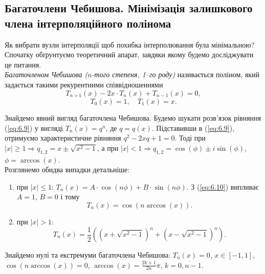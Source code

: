 \subsection{Багаточлени Чебишова. Мінімізація залишкового члена інтерполяційного полінома}

Як вибрати вузли інтерполяції щоб похибка інтерполювання була мінімальною? Спочатку обґрунтуємо теоретичний апарат, завдяки якому будемо досліджувати це питання. \\

\textit{Багаточленом Чебишова ($n$-того степеня, 1–го роду)} називається поліном, який задається такими рекурентними співвідношеннями
\begin{equation}
    \label{eq:6.9}
    T_{n+1}(x)-2x\cdot T_n(x)+T_{n-1}(x) = 0,
\end{equation}
\begin{equation}
    \label{eq:6.10}
    T_0(x) = 1, \quad T_1(x) = x.
\end{equation}

Знайдемо явний вигляд багаточлена Чебишова. Будемо шукати розв'язок рівняння (\ref{eq:6.9}) у вигляді $T_n(x) = q^n$, де $q = q(x)$. Підставивши в (\ref{eq:6.9}), отримуємо характеристичне рівняння $q^2 - 2xq + 1 = 0$. Тоді при $|x|\ge1\Rightarrow q_{1,2}=x\pm\sqrt{x^2-1}$, а при $|x|<1\Rightarrow q_{1,2}=\cos(\phi)\pm i\sin(\phi)$, $\phi = \arccos(x)$. \\

Розглянемо обидва випадки детальніше:
\begin{enumerate}
    \item при $|x| \le 1$: $T_n(x) = A\cdot\cos(n\phi) + B\cdot\sin(n\phi)$. З (\ref{eq:6.10}) випливає $A=1$, $B=0$ і тому
    \begin{equation}
        \label{eq:6.11}
        T_n(x) = \cos(n \arccos (x)).
    \end{equation}

    \item при $|x| > 1$:
    \begin{equation}
        \label{eq:6.12}
        T_n(x) = \dfrac12 \left(\left(x+\sqrt{x^2-1}\right)^n+\left(x-\sqrt{x^2-1}\right)^n\right).
    \end{equation}
\end{enumerate}

Знайдемо нулі та екстремуми багаточлена Чебишова: $T_n(x) = 0$, $x\in[-1,1]$, $\cos(n \arccos(x)) = 0$, $\arccos(x) = \frac{2k+1}{2n}\pi$, $k=\overline{0,n-1}$. \\

